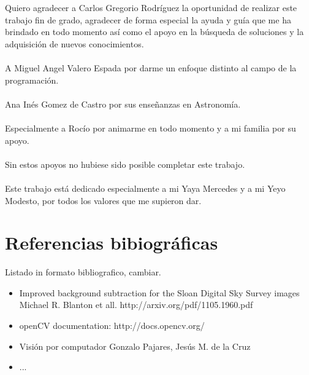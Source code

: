 	Quiero agradecer a Carlos Gregorio Rodríguez la oportunidad de realizar este trabajo fin de grado, agradecer de forma especial la ayuda y guía que me ha brindado en todo momento así como el apoyo en la búsqueda de soluciones y la adquisición de nuevos conocimientos.\\ 
	\\ A Miguel Angel Valero Espada por darme un enfoque distinto al campo de la programación.\\
	\\ Ana Inés Gomez de Castro por sus enseñanzas en Astronomía.\\
	\\ Especialmente a Rocío por animarme en todo momento y a mi familia por su apoyo.\\
	\\ Sin estos apoyos no hubiese sido posible completar este trabajo.
	\\
	\\Este trabajo está dedicado especialmente a mi Yaya Mercedes y a mi Yeyo Modesto, por todos los valores que me supieron dar.
	\newpage
	\section{Referencias bibiográficas}
	Listado in formato bibliografico, cambiar.
	\begin{itemize}
		\item Improved background subtraction for the Sloan Digital Sky Survey images Michael R. Blanton et all. http://arxiv.org/pdf/1105.1960.pdf
		\item openCV documentation: http://docs.opencv.org/
		\item Visión por computador Gonzalo Pajares, Jesús M. de la Cruz
		\item ...
	\end{itemize}
